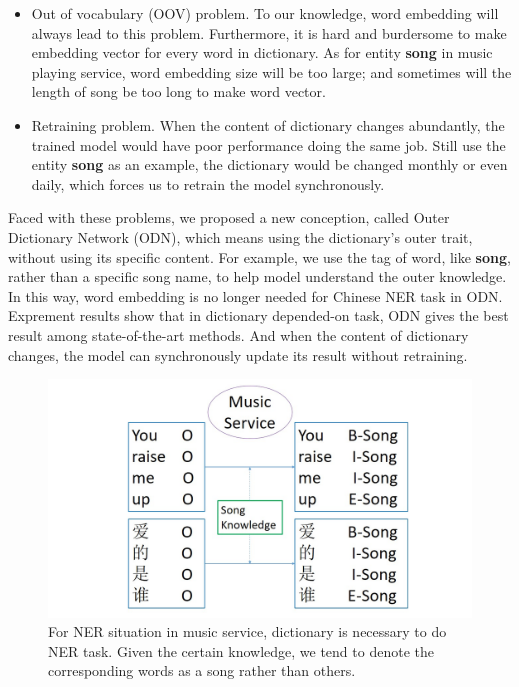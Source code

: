 \documentclass[letterpaper]{article} %
\begin{document}
\begin{itemize}
\item Out of vocabulary (OOV) problem. To our knowledge, word embedding will always lead to this problem. Furthermore, it is hard and burdersome to make embedding vector for every word in dictionary. As for entity \textbf{song} in music playing service, word embedding size will be too large; and sometimes will the length of song be too long to make word vector. 
\item Retraining problem. When the content of dictionary changes abundantly, the trained model would have poor performance doing the same job. Still use the entity \textbf{song} as an example, the dictionary would be changed monthly or even daily, which forces us to retrain the model synchronously. 
\end{itemize}

Faced with these problems, we proposed a new conception, called Outer Dictionary Network (ODN), which means using the dictionary's outer trait, without using its specific content. For example, we use the tag of word, like \textbf{song}, rather than a specific song name, to help model understand the outer knowledge. In this way, word embedding is no longer needed for Chinese NER task in ODN. Exprement results show that in dictionary depended-on task, ODN gives the best result among state-of-the-art methods. And when the content of dictionary changes, the model can synchronously update its result without retraining.

\begin{figure}[t]
\centering
\includegraphics[width=1.0\columnwidth]{gazzete_is_needed} %
\caption{For NER situation in music service, dictionary is necessary to do NER task. Given the certain knowledge, we tend to denote the corresponding words as a song rather than others.}
\label{fig_gazzete}
\end{figure}
\end{document}
